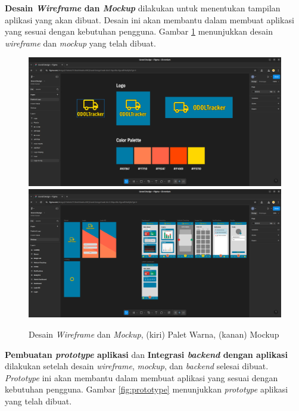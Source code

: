 \textbf{Desain \textit{Wireframe} dan \textit{Mockup}} dilakukan untuk menentukan tampilan aplikasi yang akan dibuat. Desain ini akan membantu dalam membuat aplikasi yang sesuai dengan kebutuhan pengguna. Gambar \ref{fig:wireframe} menunjukkan desain \textit{wireframe} dan \textit{mockup} yang telah dibuat.

\begin{figure}[htbp]
  \centering

  \includegraphics[scale=0.23]{gambar/bab3-color-palette.png}
  \includegraphics[scale=0.23]{gambar/bab3-mockup.png}

  \caption{\centering Desain \textit{Wireframe} dan \textit{Mockup}, (kiri) Palet Warna, (kanan) Mockup}
  \label{fig:wireframe}
\end{figure}

\textbf{Pembuatan \emph{prototype} aplikasi} dan \textbf{Integrasi \emph{backend} dengan aplikasi} dilakukan setelah desain \textit{wireframe}, \textit{mockup}, dan \emph{backend} selesai dibuat. \emph{Prototype} ini akan membantu dalam membuat aplikasi yang sesuai dengan kebutuhan pengguna. Gambar \ref{fig:prototype} menunjukkan \emph{prototype} aplikasi yang telah dibuat.

